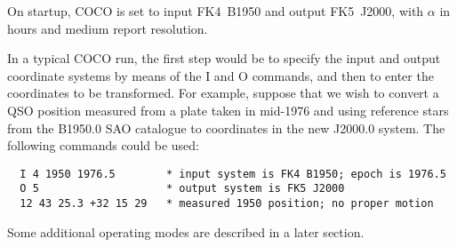 On startup, COCO is set to input FK4~B1950 and output
FK5~J2000, with $\alpha$ in hours and medium report resolution.

In a typical COCO run, the first step would be to specify the
input and output coordinate systems by means of the I and O
commands, and then to enter the coordinates to be
transformed.
For example, suppose that we wish to convert
a QSO position measured from a plate taken in mid-1976 and
using reference stars from the B1950.0 SAO catalogue to coordinates
in the new J2000.0 system.
The following commands could be used:
\begin{verbatim}
  I 4 1950 1976.5        * input system is FK4 B1950; epoch is 1976.5
  O 5                    * output system is FK5 J2000
  12 43 25.3 +32 15 29   * measured 1950 position; no proper motion
\end{verbatim}

Some additional operating modes are described in a later section.

